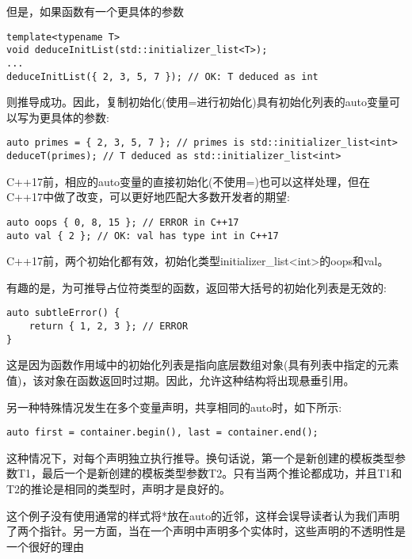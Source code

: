 但是，如果函数有一个更具体的参数

\begin{lstlisting}[style=styleCXX]
template<typename T>
void deduceInitList(std::initializer_list<T>);
...
deduceInitList({ 2, 3, 5, 7 }); // OK: T deduced as int
\end{lstlisting}

则推导成功。因此，复制初始化(使用=进行初始化)具有初始化列表的auto变量可以写为更具体的参数:

\begin{lstlisting}[style=styleCXX]
auto primes = { 2, 3, 5, 7 }; // primes is std::initializer_list<int>
deduceT(primes); // T deduced as std::initializer_list<int>
\end{lstlisting}

C++17前，相应的auto变量的直接初始化(不使用=)也可以这样处理，但在C++17中做了改变，可以更好地匹配大多数开发者的期望:

\begin{lstlisting}[style=styleCXX]
auto oops { 0, 8, 15 }; // ERROR in C++17
auto val { 2 }; // OK: val has type int in C++17
\end{lstlisting}

C++17前，两个初始化都有效，初始化类型initializer\_list<int>的oops和val。

有趣的是，为可推导占位符类型的函数，返回带大括号的初始化列表是无效的:

\begin{lstlisting}[style=styleCXX]
auto subtleError() {
	return { 1, 2, 3 }; // ERROR
}
\end{lstlisting}

这是因为函数作用域中的初始化列表是指向底层数组对象(具有列表中指定的元素值)，该对象在函数返回时过期。因此，允许这种结构将出现悬垂引用。

另一种特殊情况发生在多个变量声明，共享相同的auto时，如下所示:

\begin{lstlisting}[style=styleCXX]
auto first = container.begin(), last = container.end();
\end{lstlisting}

这种情况下，对每个声明独立执行推导。换句话说，第一个是新创建的模板类型参数T1，最后一个是新创建的模板类型参数T2。只有当两个推论都成功，并且T1和T2的推论是相同的类型时，声明才是良好的。

\begin{tcolorbox}[colback=webgreen!5!white,colframe=webgreen!75!black]
\hspace*{0.75cm}这个例子没有使用通常的样式将*放在auto的近邻，这样会误导读者认为我们声明了两个指针。另一方面，当在一个声明中声明多个实体时，这些声明的不透明性是一个很好的理由
\end{tcolorbox}


